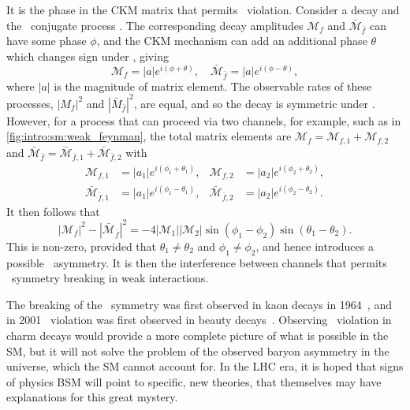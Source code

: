 It is the phase in the \ac{CKM} matrix that permits \CP\ violation.
Consider a decay  and the \CP\ conjugate process
.
The corresponding decay amplitudes $\mathcal{M}_{f}$ and 
$\bar{\mathcal{M}}_{\bar{f}}$ can have some phase $\phi$, and the \ac{CKM} 
mechanism can add an additional phase $\theta$ which changes sign under \CP, 
giving
\begin{equation}
  \mathcal{M}_{f}             = |a| e^{i(\phi + \theta)}, \quad
  \bar{\mathcal{M}}_{\bar{f}} = |a| e^{i(\phi - \theta)},
  \label{eqn:intro:sm:weak:amplitudes_one}
\end{equation}
where $|a|$ is the magnitude of matrix element.
The observable rates of these processes, $|M_{f}|^{2}$ and 
$|\bar{M}_{\bar{f}}|^{2}$, are equal, and so the decay is symmetric under 
\CP\@.
However, for a process that can proceed via two channels, for example, such as 
in \cref{fig:intro:sm:weak_feynman}, the total matrix elements are 
$\mathcal{M}_{f} = \mathcal{M}_{f,1} + \mathcal{M}_{f,2}$ and 
$\bar{\mathcal{M}}_{\bar{f}} = \bar{\mathcal{M}}_{\bar{f},1} + 
\bar{\mathcal{M}}_{\bar{f},2}$ with
\begin{align*}
  \mathcal{M}_{f,1} &= |a_{1}| e^{i(\phi_{1} + \theta_{1})}, &
  \mathcal{M}_{f,2} &= |a_{2}| e^{i(\phi_{2} + \theta_{2})},\\
  \bar{\mathcal{M}}_{\bar{f},1} &= |a_{1}| e^{i(\phi_{1} - \theta_{1})}, &
  \bar{\mathcal{M}}_{\bar{f},2} &= |a_{2}| e^{i(\phi_{2} - \theta_{2})}.
\end{align*}
It then follows that
\begin{equation*}
  |\mathcal{M}_{f}|^{2} - |\bar{\mathcal{M}}_{\bar{f}}|^{2} =
  -4|\mathcal{M}_{1}||\mathcal{M}_{2}|\sin(\phi_{1} - \phi_{2})\sin(\theta_{1} 
  - \theta_{2}).
\end{equation*}
This is non-zero, provided that $\theta_{1} \neq \theta_{2}$ and $\phi_{1} \neq 
\phi_{2}$, and hence introduces a possible \CP\ asymmetry.
It is then the interference between channels that permits \CP\ symmetry 
breaking in weak interactions.

The breaking of the \CP\ symmetry was first observed in kaon decays in 
1964~\cite{Christenson:1964fg}, and in 2001 \CP\ violation was first observed 
in beauty decays~\cite{Aubert:2001nu,Abe:2001xe}.
Observing \CP\ violation in charm decays would provide a more complete picture 
of what is possible in the \ac{SM}, but it will not solve the problem of the 
observed baryon asymmetry in the universe, which the \ac{SM} cannot account 
for.
In the \ac{LHC} era, it is hoped that signs of physics \acl{BSM} will point to 
specific, new theories, that themselves may have explanations for this great 
mystery.

